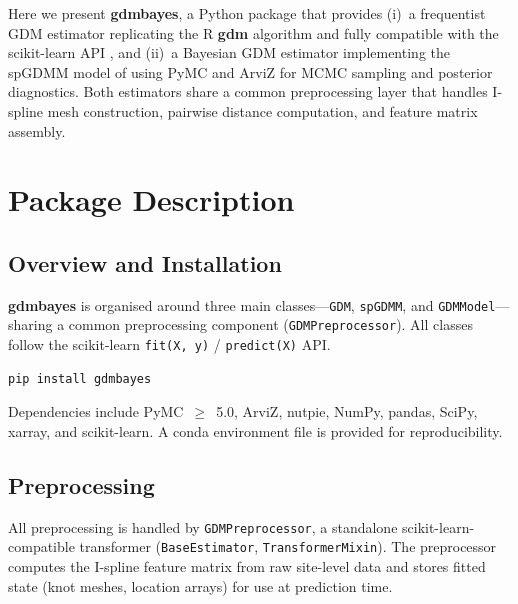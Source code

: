 \documentclass[12pt,a4paper]{article}
\begin{document}
Here we present \textbf{gdmbayes}, a Python package that provides
(i)~a frequentist GDM estimator replicating the R \textbf{gdm} algorithm and
fully compatible with the scikit-learn API \citep{pedregosa2011}, and
(ii)~a Bayesian GDM estimator implementing the spGDMM model of
\citet{white2024} using PyMC \citep{salvatier2016} and ArviZ
\citep{kumar2019} for MCMC sampling and posterior diagnostics. Both estimators
share a common preprocessing layer that handles I-spline mesh construction,
pairwise distance computation, and feature matrix assembly.

\section{Package Description}\label{sec:package}

\subsection{Overview and Installation}

\textbf{gdmbayes} is organised around three main classes---\texttt{GDM},
\texttt{spGDMM}, and \texttt{GDMModel}---sharing a common preprocessing
component (\texttt{GDMPreprocessor}). All classes follow the scikit-learn
\texttt{fit(X,~y)} / \texttt{predict(X)} API.

\begin{lstlisting}[style=bash]
pip install gdmbayes
\end{lstlisting}

\noindent Dependencies include PyMC~$\geq$~5.0, ArviZ, nutpie, NumPy, pandas,
SciPy, xarray, and scikit-learn. A conda environment file is provided for
reproducibility.

\subsection{Preprocessing}

All preprocessing is handled by \texttt{GDMPreprocessor}, a standalone
scikit-learn-compatible transformer (\texttt{BaseEstimator},
\texttt{TransformerMixin}). The preprocessor computes the I-spline feature
matrix from raw site-level data and stores fitted state (knot meshes, location
arrays) for use at prediction time.
\end{document}
